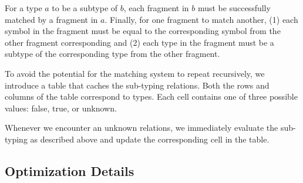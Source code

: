 For a type $a$ to be a subtype of $b$, each fragment in $b$ must be successfully matched by a fragment in $a$. Finally, for one fragment to match another, (1) each symbol in the fragment must be equal to the corresponding symbol from the other fragment corresponding and (2) each type in the fragment must be a subtype of the corresponding type from the other fragment. 

To avoid the potential for the matching system to repeat recursively, we introduce a table that caches the sub-typing relations. Both the rows and columns of the table correspond to types. Each cell contains one of three possible values: false, true, or unknown. 

Whenever we encounter an unknown relations, we immediately evaluate the sub-typing as described above and update the corresponding cell in the table.

\subsection{Optimization Details}
\label{ssec:optimization-details}

